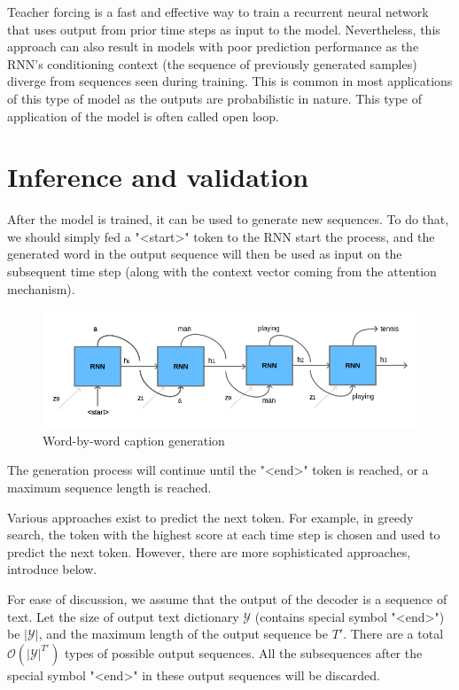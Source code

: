 Teacher forcing is a fast and effective way to train a recurrent neural network that uses output from prior time steps as input to the model. Nevertheless, this approach can also result in models with poor prediction performance as the RNN’s conditioning context (the sequence of previously generated samples) diverge from sequences seen during training\citep{Lamb2016}. This is common in most applications of this type of model as the outputs are probabilistic in nature. This type of application of the model is often called open loop.

\section{Inference and validation}\label{sec:inference}

After the model is trained, it can be used to generate new sequences. To do that, we should simply fed a "<start>" token to the RNN start the process, and the generated word in the output sequence will then be used as input on the subsequent time step (along with the context vector coming from the attention mechanism).

\begin{figure}[hpt]
	\centering
	\includegraphics[scale=0.5]{images/ch4/inference.png}
	\caption{Word-by-word caption generation}
	\label{fig:teacher-forcing}
\end{figure}

The generation process will continue until the "<end>" token is reached, or a maximum sequence length is reached.

Various approaches exist to predict the next token. For example, in greedy search, the token with the highest score at each time step is chosen and used to predict the next token. However, there are more sophisticated approaches, introduce below. 

For ease of discussion, we assume that the output of the decoder is a sequence of text. Let the size of output text dictionary $\mathcal{Y}$ (contains special symbol "<end>") be $\left|\mathcal{Y}\right|$, and the maximum length of the output sequence be $T'$. There are a total $\mathcal{O}(\left|\mathcal{Y}\right|^{T'})$ types of possible output sequences. All the subsequences after the special symbol "<end>" in these output sequences will be discarded.

